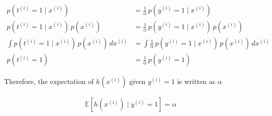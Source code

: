 \begin{answer}
\begin{align*}
    p(t^{(i)}=1\mid x^{(i)}) &= \frac{1}{\alpha}\,p(y^{(i)}=1\mid x^{(i)}) \\
    p(t^{(i)}=1\mid x^{(i)})\,p(x^{(i)}) &= \frac{1}{\alpha}\,p(y^{(i)}=1\mid x^{(i)})\,p(x^{(i)}) \\
    \int p(t^{(i)}=1\mid x^{(i)})\,p(x^{(i)})\,dx^{(i)} &= \int \frac{1}{\alpha}\,p(y^{(i)}=1\mid x^{(i)})\,p(x^{(i)})\,dx^{(i)} \\
    p(t^{(i)}=1)&=\frac{1}{\alpha}\,p(y^{(i)}=1)
\end{align*}

Therefore, the expectation of $h(x^{(i)})$ given $y^{(i)}=1$ is written as $\alpha$

\begin{align*}
    \mathbb{E}[h(x^{(i)})\mid y^{(i)}=1] = \alpha
\end{align*}

\end{answer}
